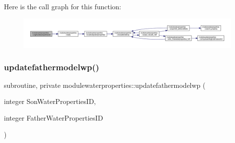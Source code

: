 Here is the call graph for this function\+:\nopagebreak
\begin{figure}[H]
\begin{center}
\leavevmode
\includegraphics[width=350pt]{namespacemodulewaterproperties_ab4f28352125d7c0b068c093e4ffb88dd_cgraph}
\end{center}
\end{figure}
\mbox{\label{namespacemodulewaterproperties_ad407a42c26969949261233d9d0aa8da1}} 
\subsubsection{\texorpdfstring{updatefathermodelwp()}{updatefathermodelwp()}}
{\footnotesize\ttfamily subroutine, private modulewaterproperties\+::updatefathermodelwp (\begin{DoxyParamCaption}\item[{integer}]{Son\+Water\+Properties\+ID,  }\item[{integer}]{Father\+Water\+Properties\+ID }\end{DoxyParamCaption})\hspace{0.3cm}{\ttfamily [private]}}

